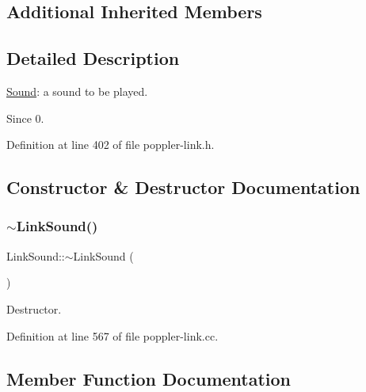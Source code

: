 \subsection*{Additional Inherited Members}


\subsection{Detailed Description}
\hyperlink{class_sound}{Sound}\+: a sound to be played.

\begin{DoxySince}{Since}
0. 
\end{DoxySince}


Definition at line 402 of file poppler-\/link.\+h.



\subsection{Constructor \& Destructor Documentation}
\mbox{\label{class_poppler_1_1_link_sound_aefbec07b84feb2618aab5446e8af7a2f}} 
\subsubsection{\texorpdfstring{$\sim$\+Link\+Sound()}{~LinkSound()}}
{\footnotesize\ttfamily Link\+Sound\+::$\sim$\+Link\+Sound (\begin{DoxyParamCaption}{ }\end{DoxyParamCaption})\hspace{0.3cm}{\ttfamily [virtual]}}

Destructor. 

Definition at line 567 of file poppler-\/link.\+cc.



\subsection{Member Function Documentation}
\mbox{\label{class_poppler_1_1_link_sound_a832bdadf229fb2379143d001e15a4697}} 

